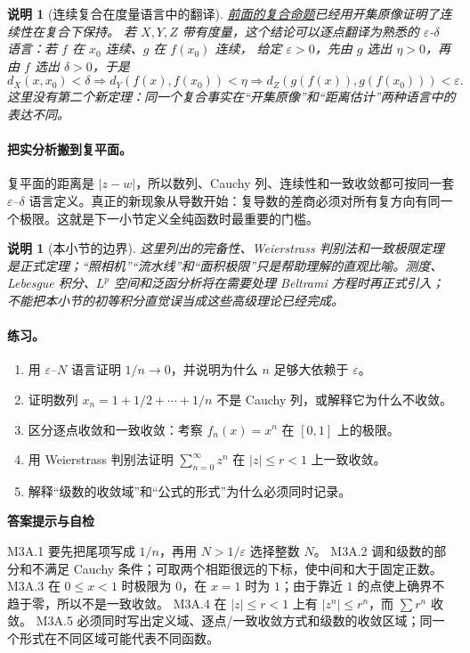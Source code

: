 \documentclass[UTF8,fontset=none,a4paper,11pt]{ctexart}
\theoremstyle{foundation-definition}
\theoremstyle{foundation-theorem}
\theoremstyle{foundation-proposition}
\theoremstyle{foundation-example}
\theoremstyle{foundation-remark}
\newtheorem{remark}[definition]{说明}
\theoremstyle{foundation-theorem}
\newcommand{\term}[2]{\hyperref[#1]{#2}}
\newenvironment{answerkey}{%
\begin{mdframed}[backgroundcolor=examplebg,linecolor=examplepurple,linewidth=1.0pt,
  leftline=true,rightline=false,topline=false,bottomline=false,
  skipabove=7pt,skipbelow=8pt,innerleftmargin=10pt,innerrightmargin=8pt,
  innertopmargin=6pt,innerbottommargin=6pt]
{\sffamily\bfseries\color{examplepurple}答案提示与自检}\par\smallskip\small
}{\end{mdframed}}
\begin{document}
\begin{remark}[连续复合在度量语言中的翻译]
\term{prop:continuous-composition}{前面的复合命题}已经用开集原像证明了连续性在复合下保持。
若 \(X,Y,Z\) 带有度量，这个结论可以逐点翻译为熟悉的
\(\varepsilon\)-\(\delta\) 语言：若 \(f\) 在 \(x_0\) 连续、\(g\) 在 \(f(x_0)\) 连续，
给定 \(\varepsilon>0\)，先由 \(g\) 选出 \(\eta>0\)，再由 \(f\) 选出
\(\delta>0\)，于是
\[
d_X(x,x_0)<\delta
\Longrightarrow d_Y(f(x),f(x_0))<\eta
\Longrightarrow d_Z(g(f(x)),g(f(x_0)))<\varepsilon.
\]
这里没有第二个新定理：同一个复合事实在“开集原像”和“距离估计”两种语言中的表达不同。
\end{remark}

\paragraph{把实分析搬到复平面。}
复平面的距离是 \(|z-w|\)，所以数列、Cauchy 列、连续性和一致收敛都可按同一套 \(\varepsilon\)--\(\delta\) 语言定义。真正的新现象从导数开始：复导数的差商必须对所有复方向有同一个极限。这就是下一小节定义全纯函数时最重要的门槛。

\begin{remark}[本小节的边界]
这里列出的完备性、Weierstrass 判别法和一致极限定理是正式定理；“照相机”“流水线”和“面积极限”只是帮助理解的直观比喻。测度、Lebesgue 积分、\(L^p\) 空间和泛函分析将在需要处理 Beltrami 方程时再正式引入；不能把本小节的初等积分直觉误当成这些高级理论已经完成。
\end{remark}

\paragraph{练习。}
\begin{enumerate}[label=M3A.\arabic*.]
  \item 用 \(\varepsilon\)--\(N\) 语言证明 \(1/n\to0\)，并说明为什么 \(n\) 足够大依赖于 \(\varepsilon\)。
  \item 证明数列 \(x_n=1+1/2+\cdots+1/n\) 不是 Cauchy 列，或解释它为什么不收敛。
  \item 区分逐点收敛和一致收敛：考察 \(f_n(x)=x^n\) 在 \([0,1]\) 上的极限。
  \item 用 Weierstrass 判别法证明 \(\sum_{n=0}^{\infty}z^n\) 在 \(|z|\leq r<1\) 上一致收敛。
  \item 解释“级数的收敛域”和“公式的形式”为什么必须同时记录。
\end{enumerate}

\begin{answerkey}
M3A.1 要先把尾项写成 \(1/n\)，再用 \(N>1/\varepsilon\) 选择整数 \(N\)。
M3A.2 调和级数的部分和不满足 Cauchy 条件；可取两个相距很远的下标，使中间和大于固定正数。
M3A.3 在 \(0\leq x<1\) 时极限为 \(0\)，在 \(x=1\) 时为 \(1\)；由于靠近 \(1\) 的点使上确界不趋于零，所以不是一致收敛。
M3A.4 在 \(|z|\leq r<1\) 上有 \(|z^n|\leq r^n\)，而 \(\sum r^n\) 收敛。
M3A.5 必须同时写出定义域、逐点/一致收敛方式和级数的收敛区域；同一个形式在不同区域可能代表不同函数。
\end{answerkey}
\end{document}
